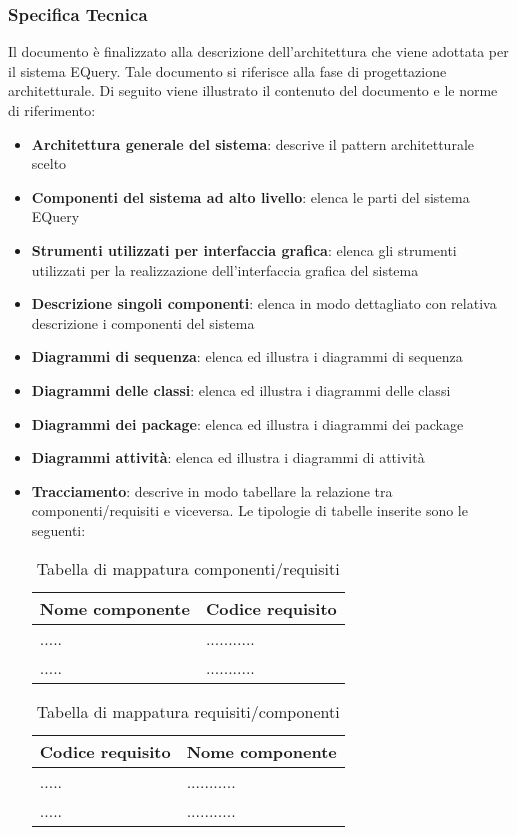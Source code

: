 \documentclass[a4paper,11pt]{article}
\begin{document}
\subsubsection{Specifica Tecnica}
Il documento \`e finalizzato alla descrizione dell'architettura che viene adottata per il sistema EQuery. Tale documento si riferisce alla fase di progettazione architetturale. Di seguito viene illustrato il contenuto del documento e le norme di riferimento:
\begin{itemize}
\item \textbf{Architettura generale del sistema}: descrive il pattern architetturale scelto
\item \textbf{Componenti del sistema ad alto livello}: elenca le parti del sistema EQuery
\item \textbf{Strumenti utilizzati per interfaccia grafica}: elenca gli strumenti utilizzati per la realizzazione dell'interfaccia grafica del sistema
\item \textbf{Descrizione singoli componenti}: elenca in modo dettagliato con relativa descrizione i componenti del sistema
\item \textbf{Diagrammi di sequenza}: elenca ed illustra i diagrammi di sequenza
\item \textbf{Diagrammi delle classi}: elenca ed illustra i diagrammi delle classi
\item \textbf{Diagrammi dei package}: elenca ed illustra i diagrammi dei package
\item \textbf{Diagrammi attivit\`a}: elenca ed illustra i diagrammi di attivit\`a
\item \textbf{Tracciamento}: descrive in modo tabellare la relazione tra componenti/requisiti e viceversa. Le tipologie di tabelle inserite sono le seguenti:
\begin{table}[h!]
\begin{tabularx}{\textwidth}{XX}
Nome componente & Codice requisito \\
\toprule
..... & ........... \\
\midrule
..... & ........... \\
\midrule
\end{tabularx}
\caption{Tabella di mappatura componenti/requisiti}
\end{table}
\vspace{3 mm}

\begin{table}[h!]
\begin{tabularx}{\textwidth}{XX}
Codice requisito & Nome componente \\
\toprule
..... & ........... \\
\midrule
..... & ........... \\
\midrule
\end{tabularx}
\caption{Tabella di mappatura requisiti/componenti}
\end{table}
\vspace{3 mm}
\end{itemize}
\end{document}
